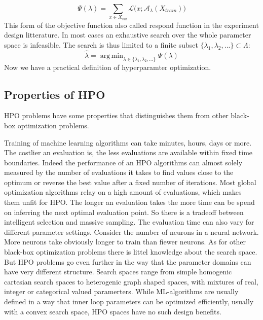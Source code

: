 \documentclass[english]{article}
\DeclareMathOperator*{\argmin}{arg\,min}
\begin{document}
\begin{equation}
  \Psi(\lambda) = \sum_{x \in X_{val}} \mathcal{L}\big(x;\mathcal{A}_\lambda(X_{train})\big)
\end{equation}
This form of the objective function also called respond function in the experiment design litterature. In most cases an exhaustive search over the whole parameter space is infeasible. The search is thus limited to a finite subset $\{\lambda_1, \lambda_2, ... \} \subset \Lambda$:
\begin{equation}
  \hat{\lambda} = \argmin_{\lambda \in \{\lambda_1, \lambda_2, ... \}} \Psi(\lambda)
\label{empirical hypa_opt_1}
\end{equation}
Now we have a practical definition of hyperparamter optimization.

\subsection{Properties of HPO}
HPO problems have some properties that distinguishes them from other black-box optimization problems.

Training of machine learning algorithms can take minutes, hours, days or more. The costlier an evaluation is, the less evaluations are available within fixed time boundaries. Indeed the performance of an HPO algorithms can almost solely measured by the number of evaluations it takes to find values close to the optimum or reverse the best value after a fixed number of iterations. Most global optimization algorithms relay on a high amount of evaluations, which makes them unfit for HPO. The longer an evaluation takes the more time can be spend on inferring the next optimal evaluation point. So there is a tradeoff between intelligent selection and massive sampling. The evaluation time can also vary for different parameter settings. Consider the number of neurons in a neural network. More neurons take obviously longer to train than fiewer neurons.
As for other black-box optimization problems there is littel knowledge about the search space. But HPO problems go even further in the way that the parameter domains can have very different structure. Search spaces range from simple homogenic cartesian search spaces to heterogenic graph shaped spaces, with mixtures of real, integer or categorical valued paramerters. While \ac{ML}-algorithms are usually defined in a way that inner loop parameters can be optimized efficiently, usually with a convex search space, HPO spaces have no such design benefits.
\end{document}

